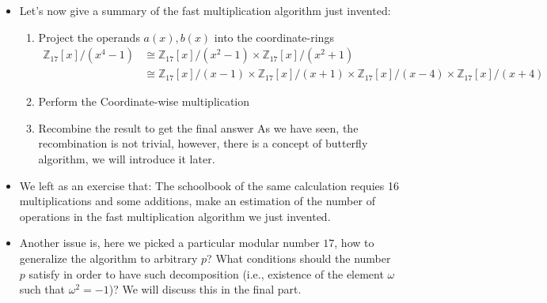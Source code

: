 \begin{frame}
    \begin{itemize}
        \item <1->Let's now give a summary of the fast multiplication algorithm just invented:
            \begin{enumerate}
                \item <2->Project the operands \( a(x), b(x) \) into the coordinate-rings
                    \begin{align*}
                        \mathbb{Z}_{17}[x] / (x^{4} - 1) &\cong
                        \mathbb{Z}_{17}[x] / (x^2-1) \times
                        \mathbb{Z}_{17}[x] / (x^2+1) \\
                        &\cong
                        \mathbb{Z}_{17}[x] / (x-1) \times
                        \mathbb{Z}_{17}[x] / (x+1) \times
                        \mathbb{Z}_{17}[x] / (x-4) \times
                        \mathbb{Z}_{17}[x] / (x+4)
                    \end{align*}
                \item <3->Perform the Coordinate-wise multiplication
                \item <4->Recombine the result to get the final answer
                    As we have seen, the recombination is not trivial, however, 
                    there is a concept of butterfly algorithm, 
                    we will introduce it later.
            \end{enumerate}
        \item <5->We left as an exercise that: 
            The schoolbook of the same calculation requies 16 multiplications and some additions,
            make an estimation of the number of operations in the fast multiplication algorithm we just invented.

        \item <6->Another issue is, here we picked a particular modular number \(17\), 
            how to generalize the algorithm to arbitrary \(p\)?
            What conditions should the number \(p\) satisfy in order to have such decomposition 
            (i.e., existence of the element \(\omega\) such that \(\omega^{2} = -1\))?
            We will discuss this in the final part. 
    \end{itemize}
\end{frame}

